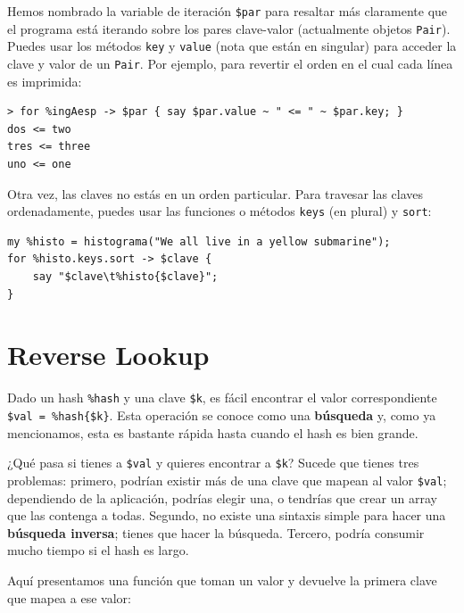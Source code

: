 Hemos nombrado la variable de iteración \verb|$par| para
resaltar más claramente que el programa está iterando
sobre los pares clave-valor (actualmente objetos \verb|Pair|).
Puedes usar los métodos {\tt key} y {\tt value} (nota que
están en singular) para acceder
la clave y valor de un \verb|Pair|. Por ejemplo, para revertir
el orden en el cual cada línea es imprimida:

\begin{verbatim}
> for %ingAesp -> $par { say $par.value ~ " <= " ~ $par.key; }
dos <= two
tres <= three
uno <= one
\end{verbatim}

Otra vez, las claves no estás en un orden particular. Para
travesar las claves ordenadamente, puedes usar las funciones
o métodos {\tt keys} (en plural) y {\tt sort}:

\begin{verbatim}
my %histo = histograma("We all live in a yellow submarine");
for %histo.keys.sort -> $clave {
    say "$clave\t%histo{$clave}";
}
\end{verbatim}



\section{Reverse Lookup}
\label{raise}

Dado un hash \verb|%hash| y una clave \verb|$k|, es fácil 
encontrar el valor correspondiente \verb|$val = %hash{$k}|.
Esta operación se conoce como una {\bf búsqueda} y, como ya
mencionamos, esta es bastante rápida hasta cuando el hash
es bien grande.

¿Qué pasa si tienes a \verb|$val| y quieres encontrar a \verb|$k|?
Sucede que tienes tres problemas: primero, podrían existir más
de una clave que mapean al valor \verb|$val|; dependiendo de
la aplicación, podrías elegir una, o tendrías que crear un array 
que las contenga a todas. Segundo, no existe una sintaxis simple
para hacer una {\bf búsqueda inversa}; tienes que hacer la búsqueda.
Tercero, podría consumir mucho tiempo si el hash es largo.

Aquí presentamos una función que toman un valor y devuelve
la primera clave que mapea a ese valor:

